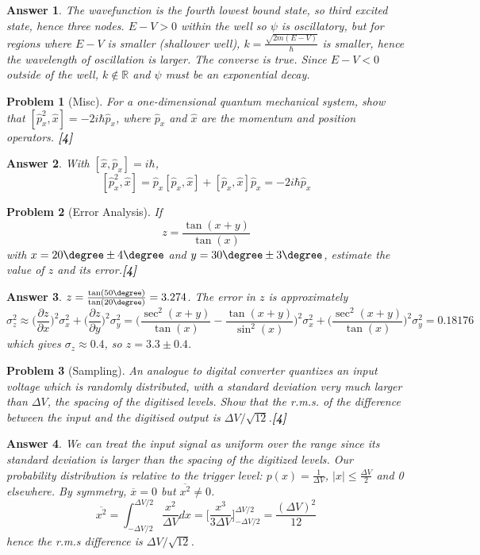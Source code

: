 \documentclass[a4paper]{article}
\newtheorem{ans}{Answer}[subsection]
\theoremstyle{new}
\newtheorem{qns}{Problem}[subsection]
\begin{document}
\begin{ans}
The wavefunction is the fourth lowest bound state, so third excited state, hence three nodes. $E-V>0$ within the well so $\psi$ is oscillatory, but for regions where $E-V$ is smaller (shallower well), $k=\frac{\sqrt{2m(E-V)}}{\hbar}$ is smaller, hence the wavelength of oscillation is larger. The converse is true. Since $E-V<0$ outside of the well, $k\notin\mathbb{R}$ and $\psi$ must be an exponential decay.
\end{ans}
\begin{qns}[Misc]
For a one-dimensional quantum mechanical system, show that $[\hat{p}_x^2,\hat{x}]=-2i\hbar\hat{p}_x$, where $\hat{p}_x$ and $\hat{x}$ are the momentum and position operators. \hfill\textbf{[4]}
\end{qns}
\begin{ans}
With $[\hat{x},\hat{p}_x]=i\hbar$,
$$[\hat{p}_x^2,\hat{x}]=\hat{p}_x[\hat{p}_x,\hat{x}]+[\hat{p}_x,\hat{x}]\hat{p}_x=-2i\hbar\hat{p}_x$$
\end{ans}
\begin{qns}[Error Analysis]
If
$$z=\frac{\tan(x+y)}{\tan(x)}$$
with $x = 20\degree\pm 4\degree$ and $y = 30\degree\pm 3\degree$, estimate the value of $z$ and its error.\hfill\textbf{[4]}
\end{qns}
\begin{ans}
$z=\frac{\tan(50\degree)}{\tan(20\degree)}=3.274$. The error in $z$ is approximately
$$\sigma_z^2\approx\bigg(\frac{\partial z}{\partial x}\bigg)^2\sigma_x^2+\bigg(\frac{\partial z}{\partial y}\bigg)^2\sigma_y^2=\bigg(\frac{\sec^2(x+y)}{\tan(x)}-\frac{\tan(x+y)}{\sin^2(x)}\bigg)^2\sigma_x^2+\bigg(\frac{\sec^2(x+y)}{\tan(x)}\bigg)^2\sigma_y^2=0.18176$$
which gives $\sigma_z\approx 0.4$, so $z=3.3\pm0.4$.
\end{ans}
\begin{qns}[Sampling]
An analogue to digital converter quantizes an input voltage which is randomly distributed, with a standard deviation very much larger than $\Delta V$, the spacing of the digitised levels. Show that the r.m.s. of the difference between the input and the digitised output is $\Delta V/\sqrt{12}$.\hfill\textbf{[4]}
\end{qns}
\begin{ans}
We can treat the input signal as uniform over the range since its standard deviation is larger than the spacing of the digitized levels. Our probability distribution is relative to the trigger level: $p(x)=\frac{1}{\Delta V}$, $|x|\leq\frac{\Delta V}{2}$ and 0 elsewhere. By symmetry, $\overline{x}=0$ but $\overline{x^2}\neq 0$.
$$\overline{x^2}=\int_{-\Delta V/2}^{\Delta V/2}\frac{x^2}{\Delta V}dx=\bigg[\frac{x^3}{3\Delta V}\bigg]^{\Delta V/2}_{-\Delta V/2}=\frac{(\Delta V)^2}{12}$$
hence the r.m.s difference is $\Delta V/\sqrt{12}$.
\end{ans}
\newpage
\end{document}
